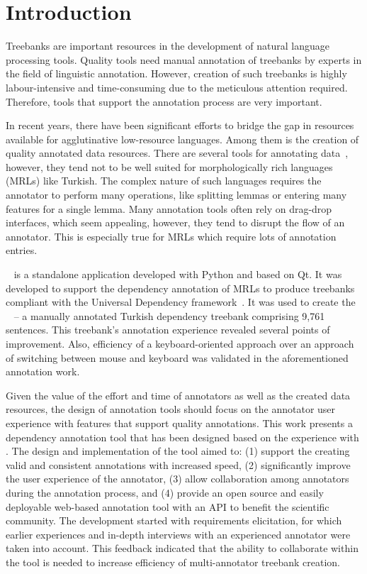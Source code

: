 \section{Introduction}
\label{sec:introduction}

Treebanks are important resources in the development of natural language processing tools.
Quality tools need manual annotation of treebanks by experts in the field of linguistic annotation.
However, creation of such treebanks is highly labour-intensive and time-consuming due to the meticulous attention required.
Therefore, tools that support the annotation process are very important.

In recent years, there have been significant efforts to bridge the gap in resources available for agglutinative low-resource languages.
Among them is the creation of quality annotated data resources.
There are several tools for annotating data~\cite{UD}, however, they tend not to be well suited for morphologically rich languages (MRLs) like Turkish.
The complex nature of such languages requires the annotator to perform many operations, like splitting lemmas or entering many features for a single lemma.
Many annotation tools often rely on drag-drop interfaces, which seem appealing, however, they tend to disrupt the flow of an annotator.
This is especially true for MRLs which require lots of annotation entries.

\boatvone~\cite{trk2020resources} is a standalone application developed with Python and based on Qt.
It was developed to support the dependency annotation of MRLs to produce treebanks compliant with the Universal Dependency framework~\cite{UD}.
It was used to create the \bountreebank~\cite{turk-etal-2019-turkish,trk2020resources,UD-Boun-Treebank} -- a manually annotated Turkish dependency treebank comprising 9,761 sentences.
This treebank's annotation experience revealed several points of improvement.
Also, efficiency of a keyboard-oriented approach over an approach of switching between mouse and keyboard was validated in the aforementioned annotation work.

Given the value of the effort and time of annotators as well as the created data resources, the design of annotation tools should focus on the annotator user experience with features that support quality annotations.
This work presents a dependency annotation tool that has been designed based on the experience with \boatvone.
The design and implementation of the tool aimed to: (1) support the creating valid and consistent annotations with increased speed, (2) significantly improve the user experience of the annotator, (3) allow collaboration among annotators during the annotation process, and (4) provide an open source and easily deployable web-based annotation tool with an API to benefit the scientific community.
The development started with requirements elicitation, for which earlier experiences and in-depth interviews with an experienced annotator were taken into account.
This feedback indicated that the ability to collaborate within the tool is needed to increase efficiency of multi-annotator treebank creation.

